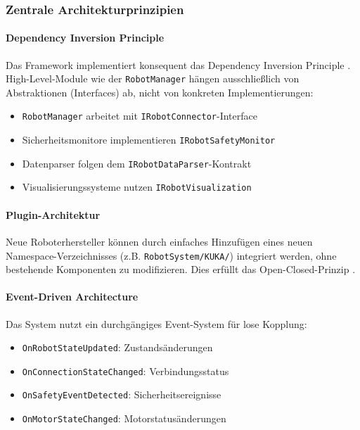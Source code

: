 

\subsubsection{Zentrale Architekturprinzipien}

\paragraph{Dependency Inversion Principle}
Das Framework implementiert konsequent das Dependency Inversion Principle
\cite{martin2000design}. High-Level-Module wie der \texttt{RobotManager} hängen
ausschließlich von Abstraktionen (Interfaces) ab, nicht von konkreten
Implementierungen:

\begin{itemize}
    \item \texttt{RobotManager} arbeitet mit \texttt{IRobotConnector}-Interface
    \item Sicherheitsmonitore implementieren \texttt{IRobotSafetyMonitor}
    \item Datenparser folgen dem \texttt{IRobotDataParser}-Kontrakt
    \item Visualisierungssysteme nutzen \texttt{IRobotVisualization}
\end{itemize}

\paragraph{Plugin-Architektur}
Neue Roboterhersteller können durch einfaches Hinzufügen eines neuen
Namespace-Verzeichnisses (z.B. \texttt{RobotSystem/KUKA/}) integriert werden,
ohne bestehende Komponenten zu modifizieren. Dies erfüllt das
Open-Closed-Prinzip \cite{martin2003agile}.

\paragraph{Event-Driven Architecture}
Das System nutzt ein durchgängiges Event-System für lose Kopplung:
\begin{itemize}
    \item \texttt{OnRobotStateUpdated}: Zustandsänderungen
    \item \texttt{OnConnectionStateChanged}: Verbindungsstatus
    \item \texttt{OnSafetyEventDetected}: Sicherheitsereignisse
    \item \texttt{OnMotorStateChanged}: Motorstatusänderungen
\end{itemize}

